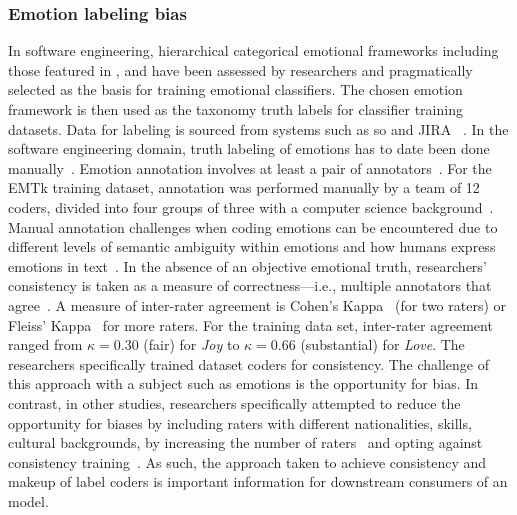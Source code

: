\subsubsection{Emotion labeling bias}\label{ase2020-industry:SubSubSection:EmotionLabelingBias}
In software engineering, hierarchical categorical emotional frameworks including those featured in \citet{Parrott2001}, \citet{Ekman1978} and \citet{shaver1987} have been assessed by researchers and pragmatically selected as the basis for training emotional classifiers.  The chosen emotion framework is then used as the taxonomy truth labels for classifier training datasets.  Data for labeling is sourced from systems such as \gls{so} and JIRA ~\citep{murgia2014, ortu2016, gachechiladze2017, novielli2018}.  In the software engineering domain, truth labeling of emotions has to date been done manually~\citep{murgia2014, novielli2018, gachechiladze2017}.  Emotion annotation involves at least a pair of annotators~\citep{Ghazi2010HierarchicalTexts, Aman2007IdentifyingText}. For the EMTk training dataset, annotation was performed manually by a team of 12 coders, divided into four groups of three with a computer science background~\citep{calefato2017, novielli2018}.  Manual annotation challenges when coding emotions can be encountered due to different levels of semantic ambiguity within emotions and how humans express emotions in text~\citep{Hasan2014UsingMessages}. In the absence of an objective emotional truth, researchers' consistency is taken as a measure of correctness---i.e., multiple annotators that agree~\citep{murgia2014}.  A measure of inter-rater agreement is Cohen's Kappa~\citep{Cohen:1960tf} (for two raters) or  Fleiss' Kappa~\citep{Fleiss:1971ff} for more raters.  For the training data set, inter-rater agreement ranged from  $\kappa=0.30$ (fair) for \textit{Joy} to $\kappa=0.66$ (substantial) for \textit{Love}.  The researchers specifically trained dataset coders for consistency. The challenge of this approach with a subject such as emotions is the opportunity for bias.  In contrast, in other studies, researchers specifically attempted to reduce the opportunity for biases by including raters with different nationalities, skills, cultural backgrounds, by increasing the number of raters~\citep{ortu2016} and opting against consistency training~\citep{Alm2005EmotionsText}.  As such, the approach taken to achieve consistency and makeup of label coders is important information for downstream consumers of an  model.


